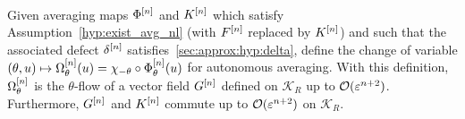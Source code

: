 \begin{theorem} \hspace*{1em} 
\\
  Given averaging maps $\Phi^{[n]}$ and $K^{[n]}$ which satisfy
  Assumption~\ref{hyp:exist_avg_nl} (with $F^{[n]}$ replaced by $K^{[n]}$)
  and such that the associated defect $\delta^{[n]}$
  satisfies~\eqref{sec:approx:hyp:delta}, define the change of variable
  $(\theta, u) \mapsto \Omega^{[n]} _\theta(u) = \chi _{-\theta} \circ
  \Phi^{[n]} _\theta(u)$ for autonomous averaging. With this definition,
  $\Omega^{[n]} _\theta$ is the $\theta$-flow of a vector field $G^{[n]}$
  defined on $\mathcal{K}_R$ up to $\mathcal{O}(\varepsilon^{n+2})$. Furthermore, $G^{[n]}$ and $K^{[n]}$ commute up to $\mathcal{O}(\varepsilon^{n+2})$ on $\mathcal{K}_{R}$. 
\end{theorem}

